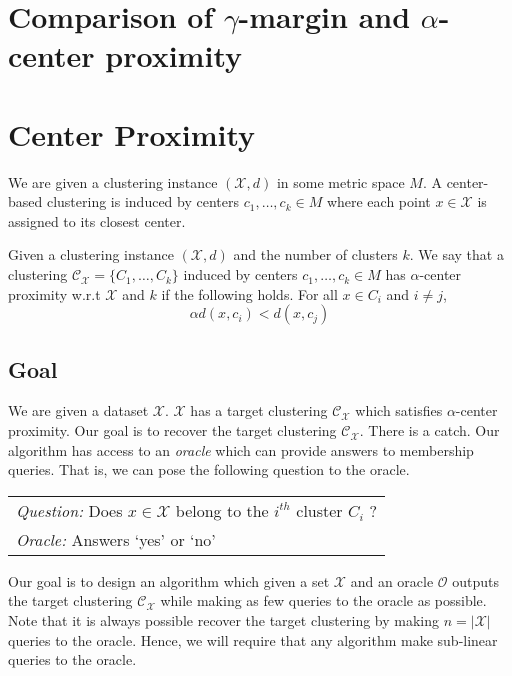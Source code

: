 \documentclass[orivec]{llncs}
\newcommand{\mc}{\mathcal}
\begin{document}
\section{Comparison of $\gamma$-margin and $\alpha$-center proximity}
\label{appendix:gammaMrginVsAlphaCenter}


\section{Center Proximity}
We are given a clustering instance $(\mc X, d)$ in some metric space $M$. A center-based clustering is induced by centers $c_1, \ldots, c_k \in M$ where each point $x \in \mc X$ is assigned to its closest center.

\begin{definition}
\label{defn:alphacp}
Given a clustering instance $(\mc X, d)$ and the number of clusters $k$. We say that a clustering $\mc C_{\mc X} = \{C_1, \ldots, C_k\}$ induced by centers $c_1, \ldots, c_k \in M$ has $\alpha$-center proximity w.r.t $\mc X$ and $k$ if the following holds. For all $x \in C_i$ and $i\neq j$, 
$$\alpha d(x, c_i) < d(x, c_j)$$
\end{definition}

\subsection{Goal}
We are given a dataset $\mc X$. $\mc X$ has a target clustering $\mc C_{\mc X}$ which satisfies $\alpha$-center proximity. Our goal is to recover the target clustering $\mc C_{\mc X}$. There is a catch. Our algorithm has access to an {\it oracle} which can provide answers to membership queries. That is, we can pose the following question to the oracle.
\begin{center}
  \begin{tabular}{l}
	{\it Question:} Does $x \in \mc X$ belong to the $i^{th}$ cluster $C_i$ ? \\
	{\it Oracle:} Answers `yes' or `no'
  \end{tabular}
\end{center}

\noindent Our goal is to design an algorithm which given a set $\mc X$ and an oracle $\mc O$ outputs the target clustering $\mc C_{\mc X}$ while making as few queries to the oracle as possible. Note that it is always possible recover the target clustering by making $n = |\mc X|$ queries to the oracle. Hence, we will require that any algorithm make sub-linear queries to the oracle. 
\end{document}
